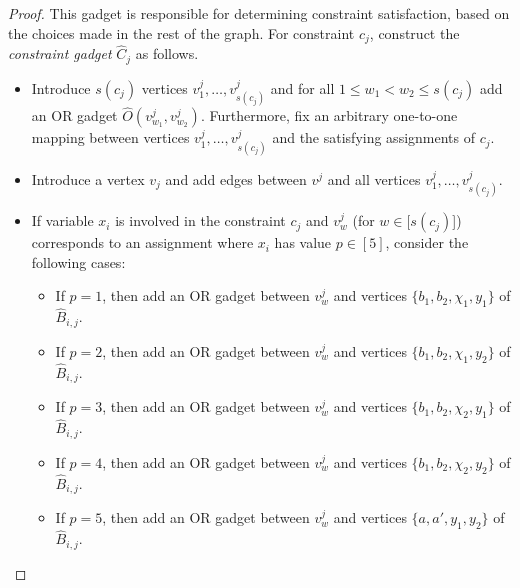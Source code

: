 \begin{proof}
        This gadget is responsible for determining constraint satisfaction,
        based on the choices made in the rest of the graph.
        For constraint $c_j$, construct the \emph{constraint gadget} $\hat{C}_j$ as follows.
        \begin{itemize}
            \item Introduce $s(c_j)$ vertices $v^j_1, \ldots, v^j_{s(c_j)}$ and
            for all $1 \le w_1 < w_2 \le s(c_j)$ add an OR gadget $\hat{O}(v^j_{w_1},v^j_{w_2})$.
            Furthermore, fix an arbitrary one-to-one mapping between vertices $v^j_1, \ldots, v^j_{s(c_j)}$ and the satisfying assignments of $c_j$.

            \item Introduce a vertex $v_j$ and add edges between $v^j$ and all vertices $v^j_1, \ldots, v^j_{s(c_j)}$.

            \item If variable $x_i$ is involved in the constraint $c_j$ and $v^j_w$ (for $w \in [s(c_j)$]) corresponds
            to an assignment where $x_i$ has value $p \in [5]$, consider the following cases:
            \begin{itemize}
                \item If $p = 1$,
                then add an OR gadget between $v^j_w$ and vertices $\{b_1, b_2, \chi_1, y_1\}$ of $\hat{B}_{i,j}$.

                \item If $p = 2$,
                then add an OR gadget between $v^j_w$ and vertices $\{b_1, b_2, \chi_1, y_2\}$ of $\hat{B}_{i,j}$.

                \item If $p = 3$,
                then add an OR gadget between $v^j_w$ and vertices $\{b_1, b_2, \chi_2, y_1\}$ of $\hat{B}_{i,j}$.

                \item If $p = 4$,
                then add an OR gadget between $v^j_w$ and vertices $\{b_1, b_2, \chi_2, y_2\}$ of $\hat{B}_{i,j}$.

                \item If $p = 5$,
                then add an OR gadget between $v^j_w$ and vertices $\{a, a',y_1, y_2\}$ of $\hat{B}_{i,j}$.
            \end{itemize}
        \end{itemize}



\end{proof}
